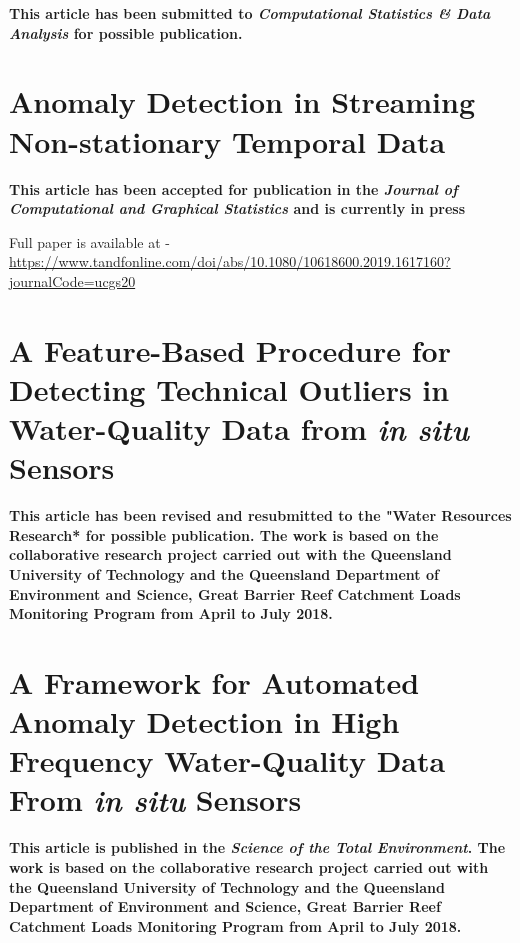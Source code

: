 \documentclass{monashthesis}
\theoremstyle{definition}
\theoremstyle{definition}
\theoremstyle{definition}
\theoremstyle{remark}
\begin{document}
\textbf{This article has been submitted to \emph{Computational Statistics \& Data Analysis} for possible publication.}



\hypertarget{ch:oddstream}{%
\chapter{Anomaly Detection in Streaming Non-stationary Temporal Data}\label{ch:oddstream}}

\textbf{This article has been accepted for publication in the \emph{Journal of Computational and Graphical Statistics} and is currently in press}

Full paper is available at - \url{https://www.tandfonline.com/doi/abs/10.1080/10618600.2019.1617160?journalCode=ucgs20}

\hypertarget{ch:oddwater_features}{%
\chapter{\texorpdfstring{A Feature-Based Procedure for Detecting Technical Outliers in Water-Quality Data from \emph{in situ} Sensors}{A Feature-Based Procedure for Detecting Technical Outliers in Water-Quality Data from in situ Sensors}}\label{ch:oddwater_features}}

\textbf{This article has been revised and resubmitted to the "Water Resources Research* for possible publication. The work is based on the collaborative research project carried out with the Queensland University of Technology and the Queensland Department of Environment and Science, Great Barrier Reef Catchment Loads Monitoring Program from April to July 2018.}



\hypertarget{ch:oddwater_main}{%
\chapter{\texorpdfstring{A Framework for Automated Anomaly Detection in High Frequency Water-Quality Data From \emph{in situ} Sensors}{A Framework for Automated Anomaly Detection in High Frequency Water-Quality Data From in situ Sensors}}\label{ch:oddwater_main}}

\textbf{This article is published in the \emph{Science of the Total Environment}. The work is based on the collaborative research project carried out with the Queensland University of Technology and the Queensland Department of Environment and Science, Great Barrier Reef Catchment Loads Monitoring Program from April to July 2018. }
\end{document}
